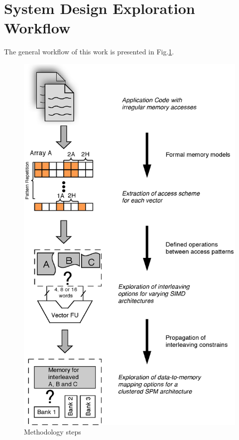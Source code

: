 \documentclass[runningheads,a4paper]{llncs}
\begin{document}

\section{System Design Exploration Workflow}

The general workflow of this work is presented in Fig.\ref{workflow}.

\begin{figure}
\centering
	\label{workflow}
	\caption{Methodology steps}
	\includegraphics[width=\textwidth]{Images/Workflow.eps} 
\end{figure}
\end{document}
